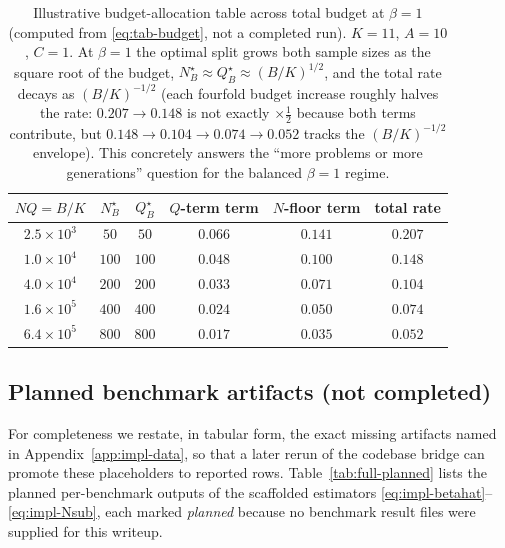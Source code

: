 \documentclass{article} %
\begin{document}
\begin{table}[t]
\centering
\small
\begin{tabular}{cccccc}
\toprule
$NQ = B/K$ & $N_B^\star$ & $Q_B^\star$ & $Q$-term term & $N$-floor term & total rate \\
\midrule
$2.5\times10^3$ & $50$  & $50$  & $0.066$ & $0.141$ & $0.207$ \\
$1.0\times10^4$ & $100$ & $100$ & $0.048$ & $0.100$ & $0.148$ \\
$4.0\times10^4$ & $200$ & $200$ & $0.033$ & $0.071$ & $0.104$ \\
$1.6\times10^5$ & $400$ & $400$ & $0.024$ & $0.050$ & $0.074$ \\
$6.4\times10^5$ & $800$ & $800$ & $0.017$ & $0.035$ & $0.052$ \\
\bottomrule
\end{tabular}
\caption{Illustrative budget-allocation table across total budget at $\beta=1$
(computed from \eqref{eq:tab-budget}, not a completed run). $K=11$, $A=10$,
$C=1$. At $\beta=1$ the optimal split grows both sample sizes as the square root
of the budget, $N_B^\star\approx Q_B^\star\approx (B/K)^{1/2}$, and the total
rate decays as $(B/K)^{-1/2}$ (each fourfold budget increase roughly halves the
rate: $0.207\!\to\!0.148$ is not exactly $\times\tfrac12$ because both terms
contribute, but $0.148\!\to\!0.104\!\to\!0.074\!\to\!0.052$ tracks the
$(B/K)^{-1/2}$ envelope). This concretely answers the ``more problems or more
generations'' question for the balanced $\beta=1$ regime.}
\label{tab:full-budget-B}
\end{table}

\subsection{Planned benchmark artifacts (not completed)}
\label{app:tab-planned}

For completeness we restate, in tabular form, the exact missing artifacts named
in Appendix~\ref{app:impl-data}, so that a later rerun of the codebase bridge
can promote these placeholders to reported rows.
Table~\ref{tab:full-planned} lists the planned per-benchmark outputs of the
scaffolded estimators \eqref{eq:impl-betahat}--\eqref{eq:impl-Nsub}, each marked
\emph{planned} because no benchmark result files were supplied for this writeup.
\end{document}
